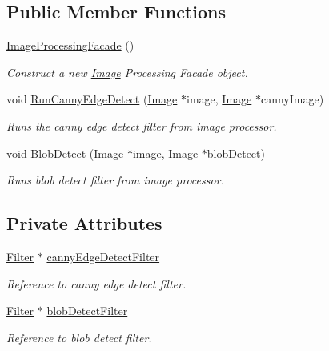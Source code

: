\subsection*{Public Member Functions}
\begin{DoxyCompactItemize}
\item 
\mbox{\label{classImageProcessingFacade_ac8691c5159915b0f48d21a24576666ec}} 
\hyperlink{classImageProcessingFacade_ac8691c5159915b0f48d21a24576666ec}{Image\+Processing\+Facade} ()
\begin{DoxyCompactList}\small\item\em Construct a new \hyperlink{classImage}{Image} Processing Facade object. \end{DoxyCompactList}\item 
void \hyperlink{classImageProcessingFacade_a320be6a053c96f9725f6526b0f4734c4}{Run\+Canny\+Edge\+Detect} (\hyperlink{classImage}{Image} $\ast$image, \hyperlink{classImage}{Image} $\ast$canny\+Image)
\begin{DoxyCompactList}\small\item\em Runs the canny edge detect filter from image processor. \end{DoxyCompactList}\item 
void \hyperlink{classImageProcessingFacade_ad65fe6e5f6db9aa5c45235b8e4486659}{Blob\+Detect} (\hyperlink{classImage}{Image} $\ast$image, \hyperlink{classImage}{Image} $\ast$blob\+Detect)
\begin{DoxyCompactList}\small\item\em Runs blob detect filter from image processor. \end{DoxyCompactList}\end{DoxyCompactItemize}
\subsection*{Private Attributes}
\begin{DoxyCompactItemize}
\item 
\mbox{\label{classImageProcessingFacade_ada20bac7f9fd22337ff810fd1786b5ee}} 
\hyperlink{classFilter}{Filter} $\ast$ \hyperlink{classImageProcessingFacade_ada20bac7f9fd22337ff810fd1786b5ee}{canny\+Edge\+Detect\+Filter}
\begin{DoxyCompactList}\small\item\em Reference to canny edge detect filter. \end{DoxyCompactList}\item 
\mbox{\label{classImageProcessingFacade_a19ac9e618b71451afe7322eb0886aad8}} 
\hyperlink{classFilter}{Filter} $\ast$ \hyperlink{classImageProcessingFacade_a19ac9e618b71451afe7322eb0886aad8}{blob\+Detect\+Filter}
\begin{DoxyCompactList}\small\item\em Reference to blob detect filter. \end{DoxyCompactList}\end{DoxyCompactItemize}


